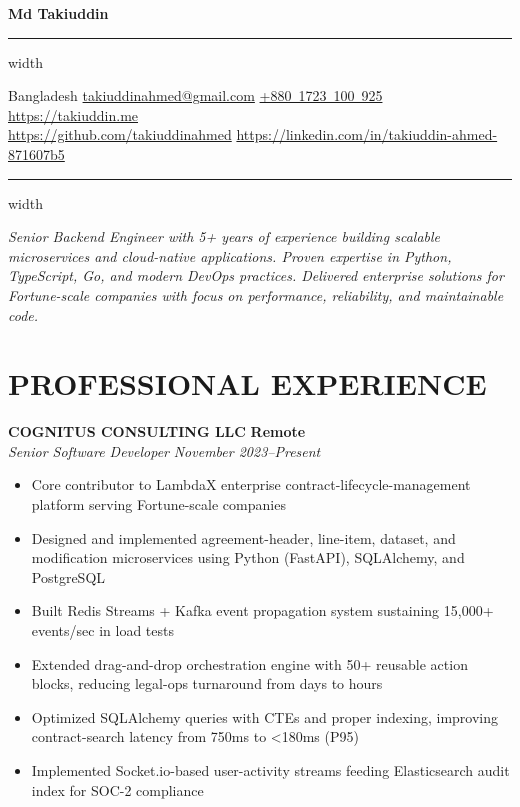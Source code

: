 \documentclass[11pt,letterpaper]{article}
\newcommand{\name}[1]{
  \begin{center}
    \Huge\textbf{#1}
  \end{center}
  \vspace{-0.5em}
  \hrule height 0.4pt width \textwidth
  \vspace{0.5em}
}
\newcommand{\contact}[6]{%
  \begin{center}\normalsize
    \mbox{{\footnotesize\faMapMarker*}\hspace{0.13cm}#1}%
    \kern0.50cm
    \mbox{\hrefWithoutArrow{mailto:#2}%
          {{\footnotesize\faEnvelope[regular]}\hspace{0.13cm}#2}}%
    \kern0.50cm
    \mbox{\hrefWithoutArrow{tel:#3}%
          {{\footnotesize\faPhone*}\hspace{0.13cm}#3}}%
    \kern0.50cm
    \mbox{\hrefWithoutArrow{#6}%
          {{\footnotesize\faLink}\hspace{0.13cm}#6}}%
    \\[0.3em]                                   %
    \mbox{\hrefWithoutArrow{#4}%
          {{\footnotesize\faGithub}\hspace{0.13cm}#4}}%
    \kern0.25cm
    \mbox{\hrefWithoutArrow{#5}%
          {{\footnotesize\faLinkedinIn}\hspace{0.13cm}#5}}%
  \end{center}
  \vspace{-0.5em}\hrule height0.4pt width\textwidth\vspace{0.5em}
}
\newcommand{\role}[4]{
  \begin{center}
  \textbf{#1} \hfill \textbf{#2} \\
  \textit{#3} \hfill \textit{#4}
  \end{center}
}
\let\hrefWithoutArrow\href
\renewcommand{\href}[2]{\hrefWithoutArrow{#1}{#2\raisebox{.15ex}{\footnotesize \faExternalLink*}}}
\begin{document}
\name{Md Takiuddin}
\vspace{-0.5em}
\contact{Bangladesh}{takiuddinahmed@gmail.com}{+880 1723 100 925}{https://github.com/takiuddinahmed}{https://linkedin.com/in/takiuddin-ahmed-871607b5}{https://takiuddin.me}


\vspace{-0.5em}
\begin{center}
\textit{Senior Backend Engineer with 5+ years of experience building scalable microservices and cloud-native applications. Proven expertise in Python, TypeScript, Go, and modern DevOps practices. Delivered enterprise solutions for Fortune-scale companies with focus on performance, reliability, and maintainable code.}
\end{center}

\section{PROFESSIONAL EXPERIENCE}

\vspace{1em}
\role{COGNITUS CONSULTING LLC}{Remote}{Senior Software Developer}{November 2023--Present}
\begin{itemize}[leftmargin=*,nosep]
  \item Core contributor to LambdaX enterprise contract-lifecycle-management platform serving Fortune-scale companies
  \item Designed and implemented agreement-header, line-item, dataset, and modification microservices using Python (FastAPI), SQLAlchemy, and PostgreSQL
  \item Built Redis Streams + Kafka event propagation system sustaining 15,000+ events/sec in load tests
  \item Extended drag-and-drop orchestration engine with 50+ reusable action blocks, reducing legal-ops turnaround from days to hours
  \item Optimized SQLAlchemy queries with CTEs and proper indexing, improving contract-search latency from 750ms to <180ms (P95)
  \item Implemented Socket.io-based user-activity streams feeding Elasticsearch audit index for SOC-2 compliance
\end{itemize}
\end{document}

